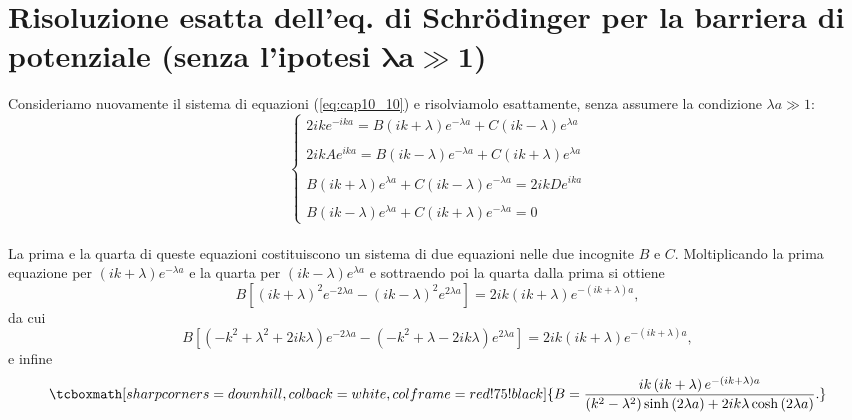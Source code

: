 \section{Risoluzione esatta dell'eq. di Schr\"{o}dinger per la barriera di potenziale (senza l'ipotesi $\mathbf{\lambda a \gg 1} $)}
Consideriamo nuovamente il sistema di equazioni (\ref{eq:cap10_10}) e risolviamolo esattamente, senza assumere la condizione $\lambda a \gg 1 $:
\begin{equation}
		\begin{cases}
		\displaystyle{2ike^{-ika}= B \left(ik+\lambda\right)e^{-\lambda a} +C \left(ik-\lambda\right)e^{\lambda a} }\\
		\\
		\displaystyle{2ikAe^{ika}= B \left(ik-\lambda\right)e^{-\lambda a} +C \left(ik+\lambda\right)e^{\lambda a} }\\
		\\
		\displaystyle{B\left(ik+\lambda\right)e^{\lambda a} + C\left(ik-\lambda\right)e^{-\lambda a} = 2ikD e^{ika}}\\
		\\
		\displaystyle{B\left(ik-\lambda\right)e^{\lambda a} + C\left(ik+\lambda\right)e^{-\lambda a} =0}
		\end{cases}
	\end{equation}\\

La prima e la quarta di queste equazioni costituiscono un sistema di due equazioni nelle due incognite $B$ e $C$. Moltiplicando la prima equazione per $(ik+\lambda) e^{-\lambda a }$ e la quarta per $(ik-\lambda) e^{\lambda a }$ e sottraendo poi la quarta dalla prima si ottiene
	\begin{equation}
		B\left[ (ik+\lambda)^2 e^{-2\lambda a }-(ik-\lambda)^2 e^{2\lambda a }\right]= 2ik(ik+\lambda) e^{-\left(ik+\lambda\right) a },
	\end{equation} 
da cui
	\begin{equation}
		B\left[ (-k^2+\lambda ^2+2ik\lambda) e^{-2\lambda a }-(-k^2+\lambda-2ik\lambda) e^{2\lambda a }\right]= 2ik(ik+\lambda) e^{-\left(ik+\lambda\right) a },
	\end{equation}
e infine
	\begin{equation}
		\tcboxmath[sharp corners=downhill, colback=white, colframe=red!75!black]{
			B=\frac{ik\left(ik+\lambda \right)e^{-\left(ik+\lambda\right) a }}{\left(k^2-\lambda^2\right)\sinh \left(2\lambda a\right)+2ik\lambda \cosh\left(2\lambda a\right)}.
			}
	\end{equation}\\
	
